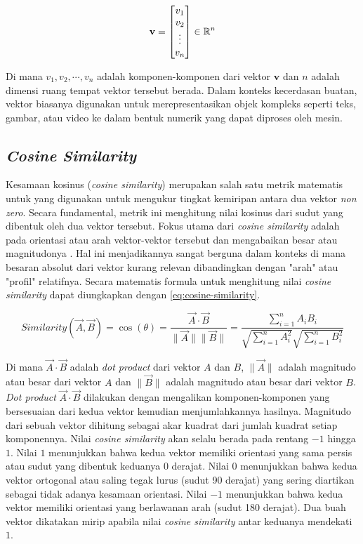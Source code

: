 \begin{equation}
	\mathbf{v} = \begin{bmatrix} v_1 \\ v_2 \\ \vdots \\ v_n \end{bmatrix} \in \mathbb{R}^n
	\label{eq:vector}
\end{equation}

Di mana $v_1, v_2, \cdots, v_n$ adalah komponen-komponen dari vektor $\mathbf{v}$ dan $n$ adalah dimensi ruang tempat vektor tersebut berada.
Dalam konteks kecerdasan buatan, vektor biasanya digunakan untuk merepresentasikan objek kompleks seperti teks, gambar, atau video ke dalam bentuk numerik yang dapat diproses oleh mesin.



\subsection{\textit{Cosine Similarity}}
Kesamaan kosinus (\textit{cosine similarity}) merupakan salah satu metrik matematis untuk yang digunakan untuk mengukur tingkat kemiripan antara dua vektor \textit{non zero}.
Secara fundamental, metrik ini menghitung nilai kosinus dari sudut yang dibentuk oleh dua vektor tersebut.
Fokus utama dari \textit{cosine similarity} adalah pada orientasi atau arah vektor-vektor tersebut dan mengabaikan besar atau magnitudonya \cite{Xia2015CosineSimilarity}.
Hal ini menjadikannya sangat berguna dalam konteks di mana besaran absolut dari vektor kurang relevan dibandingkan dengan "arah" atau "profil" relatifnya.
Secara matematis formula untuk menghitung nilai \textit{cosine similarity} dapat diungkapkan dengan \ref{eq:cosine-similarity}.

\begin{equation}
	\text{$Similarity$}(\vec{A}, \vec{B}) = \cos{(\theta)} = \frac{\vec{A} \cdot \vec{B}}{\|\vec{A}\| \|\vec{B}\|} = \frac{\sum_{i=1}^{n} A_i B_i}{\sqrt{\sum_{i=1}^{n} A_i^2} \sqrt{\sum_{i=1}^{n} B_i^2}}
	\label{eq:cosine-similarity}
\end{equation}

Di mana $\vec{A} \cdot \vec{B}$ adalah \textit{dot product} dari vektor $A$ dan $B$, $\|\vec{A}\|$ adalah magnitudo atau besar dari vektor $A$ dan $\|\vec{B}\|$ adalah magnitudo atau besar dari vektor $B$.
\textit{Dot product} $\vec{A} \cdot \vec{B}$ dilakukan dengan mengalikan komponen-komponen yang bersesuaian dari kedua vektor kemudian menjumlahkannya hasilnya.
Magnitudo dari sebuah vektor dihitung sebagai akar kuadrat dari jumlah kuadrat setiap komponennya.
Nilai \textit{cosine similarity} akan selalu berada pada rentang $-1$ hingga $1$.
Nilai $1$ menunjukkan bahwa kedua vektor memiliki orientasi yang sama persis atau sudut yang dibentuk keduanya 0 derajat.
Nilai $0$ menunjukkan bahwa kedua vektor ortogonal atau saling tegak lurus (sudut 90 derajat) yang sering diartikan sebagai tidak adanya kesamaan orientasi.
Nilai $-1$ menunjukkan bahwa kedua vektor memiliki orientasi yang berlawanan arah (sudut 180 derajat).
Dua buah vektor dikatakan mirip apabila nilai \textit{cosine similarity} antar keduanya mendekati $1$.


